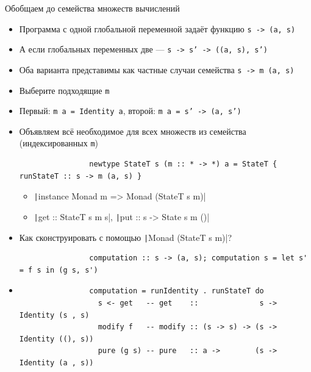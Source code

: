     \begin{frame}[fragile]{Обобщаем до семейства множеств вычислений}
        \begin{itemize}
            \item Программа с одной глобальной переменной задаёт функцию \texttt{s -> (a, s)}
            \item А если глобальных переменных две --- \texttt{s -> s' -> ((a, s), s')}
            \item Оба варианта представимы как частные случаи семейства \texttt{s -> m (a, s)}
            \item[\todo] Выберите подходящие \texttt{m}
            \item[\answer] \pause Первый: \texttt{m a = Identity a}, второй: \texttt{m a = s' -> (a, s')}
            \item Объявляем всё необходимое для всех множеств из семейства (индексированных \texttt{m})
            \begin{verbatim}
                newtype StateT s (m :: * -> *) a = StateT { runStateT :: s -> m (a, s) }
            \end{verbatim}
            \begin{itemize}
                \item \texttt|instance Monad m => Monad (StateT s m)|
                \item \texttt|get :: StateT s m s|, \texttt|put :: s -> State s m ()|
            \end{itemize}
            \item[\todo] Как сконструировать с помощью \texttt|Monad (StateT s m)|?
            \begin{verbatim}
                computation :: s -> (a, s); computation s = let s' = f s in (g s, s')
            \end{verbatim}
            \item[\answer] \pause
            \begin{verbatim}
                computation = runIdentity . runStateT do
                  s <- get   -- get    ::              s -> Identity (s , s)
                  modify f   -- modify :: (s -> s) -> (s -> Identity ((), s))
                  pure (g s) -- pure   :: a ->        (s -> Identity (a , s))
            \end{verbatim}
        \end{itemize}
    \end{frame}


